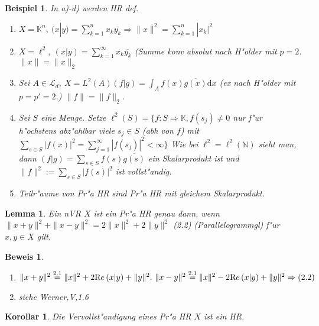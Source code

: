 \documentclass[a4paper,11pt]{book}
\newcommand{\N}{{\mathbb N}}
\newcommand{\K}{{\mathbb K}}
\newcommand{\ssL}{{\mathcal L}}
\newcommand{\re}{\ensuremath{\text Re}\,} %
\def\d{\mbox{d}}
\newtheorem{Lem}[Def]{Lemma}
\newtheorem{Kor}[Def]{Korollar}
\newtheorem{Bsp}[Def]{Beispiel}
\theoremstyle{nonumberplain}
\newtheorem{Bew}{Beweis}
\begin{document}
\begin{Bsp}
In a)-d) werden HR def.
\begin{enumerate}
\item $X = \K^n,\ (x|y) = \sum_{k=1}^n x_k \overline{y_k} \Rightarrow \|x\|^2 = \sum_{k=1}^n |x_k|^2$

\item $X = \ell^2,\ (x|y) = \sum_{k=1}^{\infty} x_k \overline{y_k}$ (Summe konv absolut nach H"older mit $p=2$. $\|x\| = \|x\|_2$

\item Sei $A \in \ssL_d,\ X = L^2(A) (f|g) = \int_A f(x) \overline{g(x)} \d x$ (ex nach H"older mit $p=p'=2$.) $\|f\|= \|f\|_2$.

\item Sei $S$ eine Menge. Setze $\ell^2(S) = \{f: S \Rightarrow \K, f(s_j) \not= 0$ nur f"ur h"ochstens abz"ahlbar viele $s_j \in S$ (abh von $f$) mit $\sum_{s \in S} |f(x)|^2 = \sum_{j=1}^{\infty} |f(s_j)|^2 < \infty \}$ Wie bei $\ell^2 = \ell^2(\N)$ sieht man, dann $(f|g) = \sum_{s \in S} f(s) \overline{g(s)}$ ein Skalarprodukt ist und $\|f\|^2 := \sum_{s \in S} |f(s)|^2$ ist vollst"andig.

\item Teilr"aume von Pr"a HR sind Pr"a HR mit gleichem Skalarprodukt.
\end{enumerate}
\end{Bsp}

\begin{Lem}
Ein nVR $X$ ist ein Pr"a HR genau dann, wenn $\|x+y\|^2 + \|x-y\|^2 = 2\|x\|^2 + 2\|y\|^2$ (2.2) (Parallelogrammgl) f"ur $x,y \in X$ gilt.
\end{Lem}


\begin{Bew}\\
\begin{enumerate}
\item[``$\Rightarrow$´´] $\|x+y\|^2 \stackrel{2.1}{=} \|x\|^2 + 2 \re (x|y) + \|y\|^2.\ \|x-y\|^2 \stackrel{2.1}{=} \|x\|^2 - 2 \re (x|y) + \|y\|^2 \Rightarrow (2.2)$

\item[``$\Leftarrow$´´] siehe Werner,V,1.6
\end{enumerate}
\end{Bew}

\begin{Kor}
Die Vervollst"andigung eines Pr"a HR $X$ ist ein HR.
\end{Kor}
\end{document}
